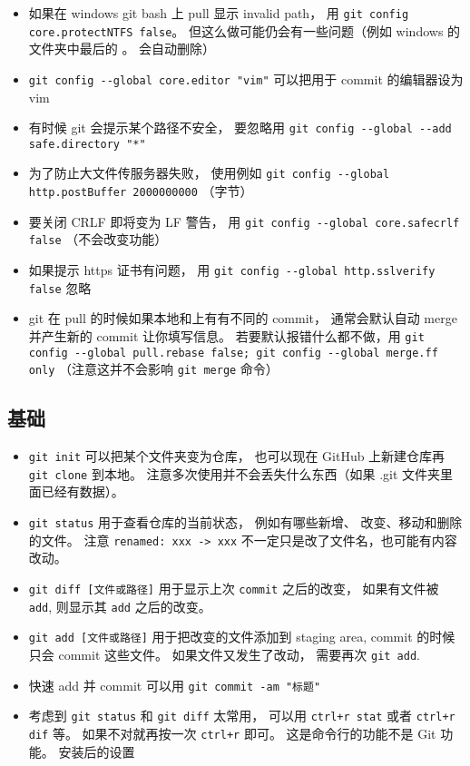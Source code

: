 \begin{itemize}
\item 如果在 windows git bash 上 pull 显示 invalid path， 用 \verb`git config core.protectNTFS false`。 但这么做可能仍会有一些问题（例如 windows 的文件夹中最后的 。 会自动删除）
\item \verb`git config --global core.editor "vim"` 可以把用于 commit 的编辑器设为 vim
\item 有时候 git 会提示某个路径不安全， 要忽略用 \verb`git config --global --add safe.directory "*"`
\item 为了防止大文件传服务器失败， 使用例如 \verb`git config --global http.postBuffer 2000000000` （字节）
\item 要关闭 CRLF 即将变为 LF 警告， 用 \verb`git config --global core.safecrlf false` （不会改变功能）
\item 如果提示 https 证书有问题， 用 \verb`git config --global http.sslverify false` 忽略
\item git 在 pull 的时候如果本地和上有有不同的 commit， 通常会默认自动 merge 并产生新的 commit 让你填写信息。 若要默认报错什么都不做，用 \verb`git config --global pull.rebase false; git config --global merge.ff only` （注意这并不会影响 \verb`git merge` 命令）
\end{itemize}

\subsection{基础}
\begin{itemize}
\item \verb`git init` 可以把某个文件夹变为仓库， 也可以现在 GitHub 上新建仓库再 \verb`git clone` 到本地。 注意多次使用并不会丢失什么东西（如果 .git 文件夹里面已经有数据）。
\item \verb`git status` 用于查看仓库的当前状态， 例如有哪些新增、 改变、移动和删除的文件。 注意 \verb`renamed: xxx -> xxx` 不一定只是改了文件名，也可能有内容改动。
\item \verb`git diff [文件或路径]` 用于显示上次 \verb`commit` 之后的改变， 如果有文件被 \verb`add`, 则显示其 \verb`add` 之后的改变。
\item \verb`git add [文件或路径]` 用于把改变的文件添加到 staging area, commit 的时候只会 commit 这些文件。 如果文件又发生了改动， 需要再次 \verb`git add`.
\item 快速 add 并 commit 可以用 \verb`git commit -am "标题"`
\item 考虑到 \verb`git status` 和 \verb`git diff` 太常用， 可以用 \verb`ctrl+r stat` 或者 \verb`ctrl+r dif` 等。 如果不对就再按一次 \verb`ctrl+r` 即可。 这是命令行的功能不是 Git 功能。
安装后的设置
\end{itemize}

